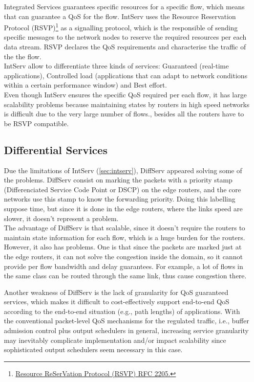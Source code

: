 Integrated Services guarantees specific resources for a specific flow, which means that can guarantee a QoS for the flow. IntServ uses the Resource Reservation Protocol (RSVP)\footnote{\href{http://tools.ietf.org/html/rfc2205}{Resource ReSerVation Protocol (RSVP) RFC 2205.}} as a signalling protocol, which is the responsible of sending specific messages to the network nodes to reserve the required resources per each data stream. RSVP declares the QoS requirements and characterise the traffic of the the flow. \\

IntServ allow to differentiate three kinds of services: Guaranteed (real-time applications), Controlled load (applications that can adapt to network conditions within a certain performance window) and Best effort.\\



Even though IntServ ensures the specific QoS required per each flow, it has large scalability problems because maintaining states by routers in high speed networks is difficult due to the very large number of flows., besides all the routers have to be RSVP compatible.   

\subsection{Differential Services}
\label{sec:diffserv}

Due the limitations of IntServ (\ref{sec:intserv}), DiffServ appeared solving some of the problems. DiffServ consist on marking the packets with a priority stamp (Differenciated Service Code Point or DSCP) on the edge routers, and the core networks use this stamp to know the forwarding priority. Doing this labelling suppose time, but since it is done in the edge routers, where the links speed are slower, it doesn't represent a problem.\\

The advantage of DiffServ is that scalable, since it doesn't require the routers to maintain state information for each flow, which is a huge burden for the routers. However, it also has problems. One is that since the packets are marked just at the edge routers, it can not solve the congestion inside the domain, so it cannot provide per flow bandwidth and delay guarantees. For example, a lot of flows in the same class can be routed through the same link, thus cause congestion there.

Another weakness of DiffServ is the lack of granularity for QoS guaranteed services, which makes it difficult to cost-effectively support end-to-end QoS according to the end-to-end situation (e.g., path lengths) of applications. With the conventional packet-level QoS mechanisms for the regulated traffic, i.e., buffer admission control plus output schedulers in general, increasing service granularity may inevitably complicate implementation and/or impact scalability since sophisticated output schedulers seem necessary in this case.


